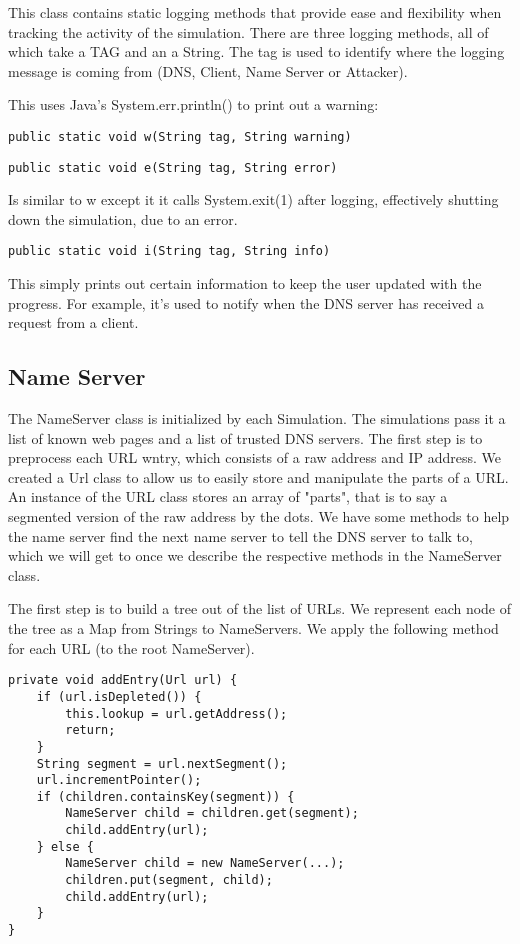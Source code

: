 \documentclass[a4paper, 12pt]{article} %
\begin{document}
This class contains static logging methods that provide ease and flexibility when tracking the activity of the simulation. There are three logging methods, all of which take a TAG and an a String. The tag is used to identify where the logging message is coming from (DNS, Client, Name Server or Attacker).

This uses Java's System.err.println() to print out a warning:

\begin{lstlisting}
public static void w(String tag, String warning)
\end{lstlisting}

\begin{lstlisting}
public static void e(String tag, String error) 
\end{lstlisting}

Is similar to w except it it calls System.exit(1) after logging, effectively shutting down the simulation, due to an error. 
\begin{lstlisting}
public static void i(String tag, String info) 
\end{lstlisting}

This simply prints out certain information to keep the user updated with the progress. For example, it’s used to notify when the DNS server has received a request from a client. 


\subsection*{Name Server}

The NameServer class is initialized by each Simulation. The simulations pass it a list of known web pages and a list of trusted DNS servers. The first step is to preprocess each URL wntry, which consists of a raw address and IP address. We created a Url class to allow us to easily store and manipulate the parts of a URL. An instance of the URL class stores an array of "parts", that is to say a segmented version of the raw address by the dots. We have some methods to help the name server find the next name server to tell the DNS server to talk to, which we will get to once we describe the respective methods in the NameServer class.

The first step is to build a tree out of the list of URLs. We represent each node of the tree as a Map from Strings to NameServers. We apply the following method for each URL (to the root NameServer).

\begin{lstlisting}
private void addEntry(Url url) {
    if (url.isDepleted()) {
        this.lookup = url.getAddress();
        return;
    }
    String segment = url.nextSegment();
    url.incrementPointer();
    if (children.containsKey(segment)) {
        NameServer child = children.get(segment);
        child.addEntry(url);
    } else {
        NameServer child = new NameServer(...);
        children.put(segment, child);
        child.addEntry(url);
    }
}
\end{lstlisting}
\end{document}
